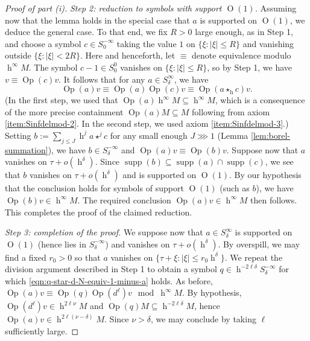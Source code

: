 \documentclass[reqno]{amsart}
\DeclareMathOperator{\h}{h}
\def\O{\operatorname{O}}
\DeclareMathOperator{\Opp}{Op}
\DeclareMathOperator{\supp}{supp}
\theoremstyle{plain} \newtheorem{theorem} {Theorem}
\theoremstyle{definition} \newtheorem{definition} [theorem] {Definition}
\theoremstyle{itplain} %
\numberwithin{equation}{section}
\numberwithin{theorem}{section}
\renewcommand{\leq}{\leqslant}
\begin{document}
\begin{proof}[Proof of part (i)]
  \emph{Step 2: reduction to symbols with support $\O(1)$.}  Assuming now that the lemma holds in the special case that $a$ is supported on $\O(1)$, we deduce the general case.  To that end, we fix $R > 0$ large enough, as in Step 1, and choose a symbol $c \in S^{-\infty}_0$ taking the value $1$ on $\{\xi : |\xi| \leq R\}$ and vanishing outside $\{\xi : |\xi| < 2 R\}$.  Here and henceforth, let $\equiv$ denote equivalence modulo $\h^\infty M$.  The symbol $c-1 \in S^0_0$ vanishes on $\{ \xi : |\xi| \leq R \}$, so by Step 1, we have $v \equiv \Opp(c) v$.  It follows that for any $a \in S_\delta^\infty$, we have
  \[
    \Opp(a) v \equiv \Opp(a) \Opp(c) v \equiv \Opp(a \star_{\h} c) v.
  \]
  (In the first step, we used that $\Opp(a) \h^\infty M \subseteq \h^\infty M$, which is a consequence of the more precise containment $\Opp(a) M \subseteq M$ following from axiom  \eqref{item:Sinfdelmod-2}.  In the second step, we used axiom \eqref{item:Sinfdelmod-3}.)
  Setting $b := \sum_{j \leq J} \h^j a \star^j c$ for any small enough $J \ggg 1$ (Lemma \ref{lem:borel-summation}), we have $b \in S^{-\infty}_\delta$ and $\Opp(a) v \equiv \Opp(b) v$.  Suppose now that $a$ vanishes on $\tau + o(\h^\delta)$.  Since $\supp(b) \subseteq \supp(a) \cap \supp(c)$, we see that $b$ vanishes on $\tau + o(\h^\delta)$ and is supported on $\O(1)$.  By our hypothesis that the conclusion holds for symbols of support $\O(1)$ (such as $b$), we have $\Opp(b) v \in \h^\infty M$.  The required conclusion $\Opp(a) v \in \h^\infty M$ then follows.  This completes the proof of the claimed reduction.

  \emph{Step 3: completion of the proof.}  We suppose now that $a \in S^{\infty}_\delta$ is supported on $\O(1)$ (hence lies in $S^{-\infty}_\delta$) and vanishes on $\tau + o(\h^\delta)$.  By overspill, we may find a fixed $r_0 > 0$ so that $a$ vanishes on $\{\tau + \xi : |\xi| \leq r_0 \h^{\delta}\}$.  We repeat the division argument described in Step 1 to obtain a symbol $q \in \h^{-2 \ell \delta} S^{-\infty}_\delta$ for which \eqref{eqn:q-star-d-N-equiv-1-minus-a} holds. %
  As before, $\Opp(a) v \equiv \Opp(q) \Opp(d^\ell ) v \mod {\h^\infty M}$.  By hypothesis, $\Opp(d^\ell) v \in \h^{2 \ell \nu} M$ and $\Opp(q) M \subseteq \h^{-2 \ell \delta} M$, hence $\Opp(a) v \in \h^{2 \ell (\nu - \delta)} M$.  Since $\nu > \delta$, we may conclude by taking $\ell$ sufficiently large.
\end{proof}
\end{document}
